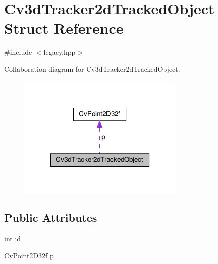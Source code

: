 \hypertarget{structCv3dTracker2dTrackedObject}{\section{Cv3d\-Tracker2d\-Tracked\-Object Struct Reference}
\label{structCv3dTracker2dTrackedObject}
}


{\ttfamily \#include $<$legacy.\-hpp$>$}



Collaboration diagram for Cv3d\-Tracker2d\-Tracked\-Object\-:\nopagebreak
\begin{figure}[H]
\begin{center}
\leavevmode
\includegraphics[width=226pt]{structCv3dTracker2dTrackedObject__coll__graph}
\end{center}
\end{figure}
\subsection*{Public Attributes}
\begin{DoxyCompactItemize}
\item 
int \hyperlink{structCv3dTracker2dTrackedObject_ae8506973231f03c325859c9d3e6e11fe}{id}
\item 
\hyperlink{structCvPoint2D32f}{Cv\-Point2\-D32f} \hyperlink{structCv3dTracker2dTrackedObject_a6547dda87ebd39274bdd54869e504fd3}{p}
\end{DoxyCompactItemize}


